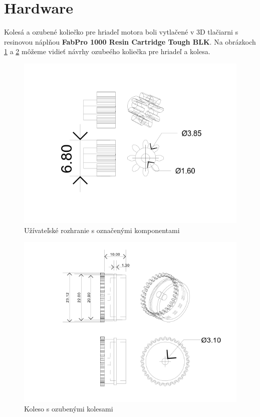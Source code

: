 
\section{Hardware}
\label{sec:hardware}
Kolesá a ozubené koliečko pre hriadeľ motora boli vytlačené v 3D tlačiarni s resinovou náplňou \textbf{FabPro 1000 Resin Cartridge Tough BLK}. Na obrázkoch \ref{fig:gear} a \ref{fig:wheel_w_gear} môžeme vidieť návrhy ozubeého koliečka pre hriadeľ a kolesa. 

\begin{figure}[!htbp]
        \centering
        \includegraphics[scale=0.8]{includes/images/motor_gear.png}
        \caption{Užívateľské rozhranie s označenými komponentami}
        \label{fig:gear}
\end{figure}

\begin{figure}[!htbp]
        \centering
        \includegraphics[scale=0.8]{includes/images/wheel_w_gear_2_blueprint.png}
        \caption{Koleso s ozubenými kolesami}
        \label{fig:wheel_w_gear}
\end{figure}

